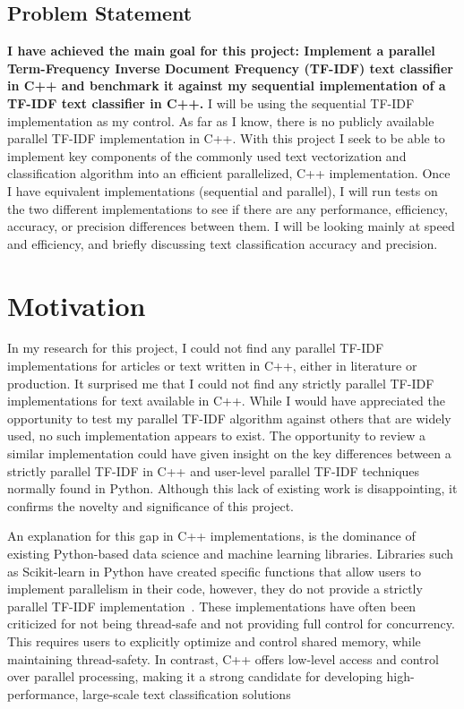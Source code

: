 \documentclass[conference]{IEEEtran}
\begin{document}
\subsection{Problem Statement}
\textbf{I have achieved the main goal for this project: Implement a parallel Term-Frequency Inverse Document Frequency (TF-IDF) text classifier in C++ and benchmark it against my sequential implementation of a TF-IDF text classifier in C++.}
I will be using the sequential TF-IDF implementation as my control. As far as I know, there is no publicly available parallel TF-IDF implementation in C++. With this project I seek to be able to implement key components of the commonly used text vectorization and classification algorithm into an efficient parallelized, C++ implementation. Once I have equivalent implementations (sequential and parallel), I will run tests on the two different implementations to see if there are any performance, efficiency, accuracy, or precision differences between them. I will be looking mainly at speed and efficiency, and briefly discussing text classification accuracy and precision.

\section{Motivation} \label{sec:motivation}
In my research for this project, I could not find any parallel TF-IDF implementations for articles or text written in C++, either in literature or production. It surprised me that I could not find any strictly parallel TF-IDF implementations for text available in C++. While I would have appreciated the opportunity to test my parallel TF-IDF algorithm against others that are widely used, no such implementation appears to exist. The opportunity to review a similar implementation could have given insight on the key differences between a strictly parallel TF-IDF in C++ and user-level parallel TF-IDF techniques normally found in Python. Although this lack of existing work is disappointing, it confirms the novelty and significance of this project.

An explanation for this gap in C++ implementations, is the dominance of existing Python-based data science and machine learning libraries. Libraries such as Scikit-learn in Python have created specific functions that allow users to implement parallelism in their code, however, they do not provide a strictly parallel TF-IDF implementation~\cite{b4}. These implementations have often been criticized for not being thread-safe and not providing full control for concurrency. This requires users to explicitly optimize and control shared memory, while maintaining thread-safety. In contrast, C++ offers low-level access and control over parallel processing, making it a strong candidate for developing high-performance, large-scale text classification solutions
\end{document}

